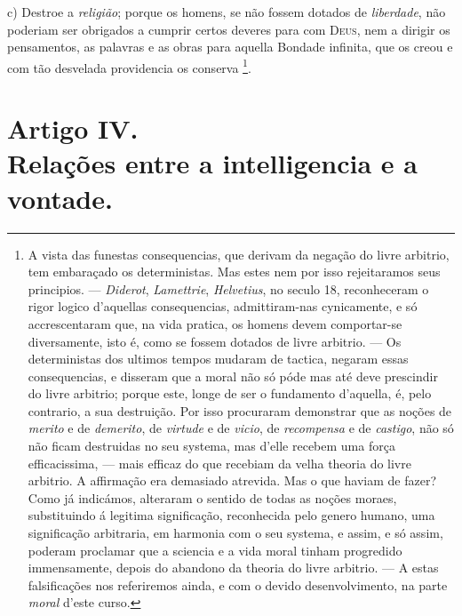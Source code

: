 c) Destroe a \emph{religião}; porque os homens, se não fossem dotados de \emph{liberdade}, não poderiam ser obrigados a cumprir certos deveres para com \textsc{Deus}, nem a dirigir os pensamentos, as palavras e as obras para aquella Bondade infinita, que os creou e com tão desvelada providencia os conserva \footnote{A vista das funestas consequencias, que derivam da negação do livre arbitrio, tem embaraçado os deterministas. Mas estes nem por isso rejeitaramos seus principios. --- \emph{Diderot}, \emph{Lamettrie}, \emph{Helvetius}, no seculo 18, reconheceram o rigor logico d'aquellas consequencias, admittiram-nas cynicamente, e só accrescentaram que, na vida pratica, os homens devem comportar-se diversamente, isto é, como se fossem dotados de livre arbitrio. --- Os deterministas dos ultimos tempos mudaram de tactica, negaram essas consequencias, e disseram que a moral não só póde mas até deve prescindir do livre arbitrio; porque este, longe de ser o fundamento d'aquella, é, pelo contrario, a sua destruição. Por isso procuraram demonstrar que as noções de \emph{merito} e de \emph{demerito}, de \emph{virtude} e de \emph{vicio}, de \emph{recompensa} e de \emph{castigo}, não só não ficam destruidas no seu systema, mas d'elle recebem uma força efficacissima, --- mais efficaz do que recebiam da velha theoria do livre arbitrio. A affirmação era demasiado atrevida. Mas o que haviam de fazer? Como já indicámos, alteraram o sentido de todas as noções moraes, substituindo á legitima significação, reconhecida pelo genero humano, uma significação arbitraria, em harmonia com o seu systema, e assim, e só assim, poderam proclamar que a sciencia e a vida moral tinham progredido immensamente, depois do abandono da theoria do livre arbitrio. --- A estas falsificações nos referiremos ainda, e com o devido desenvolvimento, na parte \emph{moral} d'este curso.}.


\section*{Artigo IV.\\ Relações entre a intelligencia e a vontade.}


